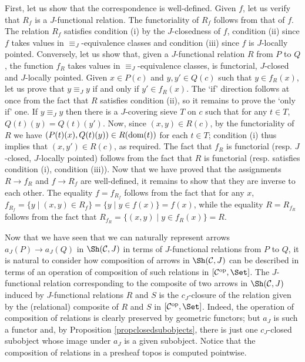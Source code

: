 \documentclass[a4paper,12pt]{article}
\begin{document}
\begin{proofs}
	First, let us show that the correspondence is well-defined. Given $f$, let us verify that $R_{f}$ is a $J$-functional relation. The functoriality of $R_{f}$ follows from that of $f$. The relation $R_{f}$ satisfies condition (i) by the $J$-closedness of $f$, condition (ii) since $f$ takes values in $\equiv_{J}$-equivalence classes and condition (iii) since $f$ is $J$-locally pointed. Conversely, let us show that, given a $J$-functional relation $R$ from $P$ to $Q$, the function $f_{R}$ takes values in $\equiv_{J}$-equivalence classes, is functorial, $J$-closed and $J$-locally pointed. Given $x\in P(c)$ and $y, y'\in Q(c)$ such that $y\in f_{R}(x)$, let us prove that $y\equiv_{J} y$ if and only if $y'\in f_{R}(x)$. The `if' direction follows at once from the fact that $R$ satisfies condition (ii), so it remains to prove the `only if' one. If $y\equiv_{J} y$ then there is a $J$-covering sieve $T$ on $c$ such that for any $t\in T$, $Q(t)(y)=Q(t)(y')$. Now, since $(x, y)\in R(c)$, by the functoriality of $R$ we have $(P(t)(x), Q(t)(y))\in R(\textup{dom}(t))$ for each $t\in T$; condition (i) thus implies that $(x, y')\in R(c)$, as required. The fact that $f_{R}$ is functorial (resp. $J$-closed,  $J$-locally pointed) follows from the fact that $R$ is functorial (resp. satisfies condition (i), condition (iii)). Now that we have proved that the assignments $R \to f_{R}$ and $f \to R_{f}$ are well-defined, it remains to show that they are inverse to each other. The equality $f=f_{R_{f}}$ follows from the fact that for any $x$, $f_{R_{f}}=\{y \mid (x, y)\in R_{f}\}=\{y \mid y\in f(x)\}=f(x)$, while the equality $R=R_{f_{R}}$ follows from the fact that $R_{f_{R}}=\{(x, y) \mid y\in f_{R}(x)\}=R$. 
\end{proofs}

Now that we have seen that we can naturally represent arrows $a_{J}(P)\to a_{J}(Q)$ in $\Sh({\cal C}, J)$ in terms of $J$-functional relations from $P$ to $Q$, it is natural to consider how composition of arrows in $\Sh({\cal C}, J)$ can be described in terms of an operation of composition of such relations in $[{\cal C}^{\textup{op}}, \Set]$. The $J$-functional relation corresponding to the composite of two arrows in $\Sh({\cal C}, J)$ induced by $J$-functional relations $R$ and $S$ is the $c_{J}$-closure of the relation given by the (relational) composite of $R$ and $S$ in $[{\cal C}^{\textup{op}}, \Set]$. Indeed, the operation of composition of relations is clearly preserved by geometric functors; but $a_{J}$ is such a functor and, by Proposition \ref{propclosedsubobjects}, there is just one $c_{J}$-closed subobject whose image under $a_{J}$ is a given subobject. Notice that the composition of relations in a presheaf topos is computed pointwise.  
\end{document}
